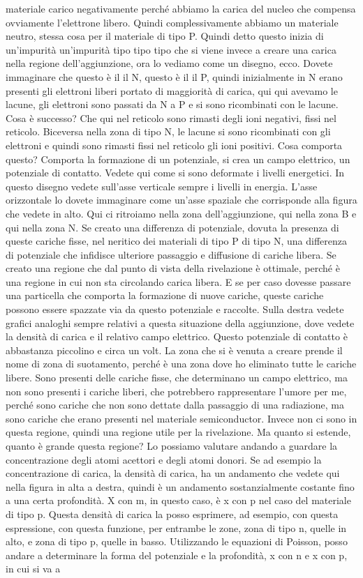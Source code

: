 materiale carico negativamente perché abbiamo la carica del nucleo che compensa ovviamente l'elettrone libero. Quindi complessivamente abbiamo un materiale neutro, stessa cosa per il materiale di tipo P. Quindi detto questo inizia di un'impurità un'impurità tipo tipo tipo che si viene invece a creare una carica nella regione dell'aggiunzione, ora lo vediamo come un disegno, ecco. Dovete immaginare che questo è il il N, questo è il il P, quindi inizialmente in N erano presenti gli elettroni liberi portato di maggiorità di carica, qui qui avevamo le lacune, gli elettroni sono passati da N a P e si sono ricombinati con le lacune. Cosa è successo? Che qui nel reticolo sono rimasti degli ioni negativi, fissi nel reticolo. Biceversa nella zona di tipo N, le lacune si sono ricombinati con gli elettroni e quindi sono rimasti fissi nel reticolo gli ioni positivi. Cosa comporta questo? Comporta la formazione di un potenziale, si crea un campo elettrico, un potenziale di contatto. Vedete qui come si sono deformate i livelli energetici. In questo disegno vedete sull'asse verticale sempre i livelli in energia. L'asse orizzontale lo dovete immaginare come un'asse spaziale che corrisponde alla figura che vedete in alto. Qui ci ritroiamo nella zona dell'aggiunzione, qui nella zona B e qui nella zona N. Se creato una differenza di potenziale, dovuta la presenza di queste cariche fisse, nel neritico dei materiali di tipo P di tipo N, una differenza di potenziale che infidisce ulteriore passaggio e diffusione di cariche libera. Se creato una regione che dal punto di vista della rivelazione è ottimale, perché è una regione in cui non sta circolando carica libera. E se per caso dovesse passare una particella che comporta la formazione di nuove cariche, queste cariche possono essere spazzate via da questo potenziale e raccolte. Sulla destra vedete grafici analoghi sempre relativi a questa situazione della aggiunzione, dove vedete la densità di carica e il relativo campo elettrico. Questo potenziale di contatto è abbastanza piccolino e circa un volt. La zona che si è venuta a creare prende il nome di zona di suotamento, perché è una zona dove ho eliminato tutte le cariche libere. Sono presenti delle cariche fisse, che determinano un campo elettrico, ma non sono presenti i cariche liberi, che potrebbero rappresentare l'umore per me, perché sono cariche che non sono dettate dalla passaggio di una radiazione, ma sono cariche che erano presenti nel materiale semiconductor. Invece non ci sono in questa regione, quindi una regione utile per la rivelazione. Ma quanto si estende, quanto è grande questa regione? Lo possiamo valutare andando a guardare la concentrazione degli atomi acettori e degli atomi donori. Se ad esempio la concentrazione di carica, la densità di carica, ha un andamento che vedete qui nella figura in alta a destra, quindi è un andamento sostanzialmente costante fino a una certa profondità. X con m, in questo caso, è x con p nel caso del materiale di tipo p. Questa densità di carica la posso esprimere, ad esempio, con questa espressione, con questa funzione, per entrambe le zone, zona di tipo n, quelle in alto, e zona di tipo p, quelle in basso. Utilizzando le equazioni di Poisson, posso andare a determinare la forma del potenziale e la profondità, x con n e x con p, in cui si va a 
